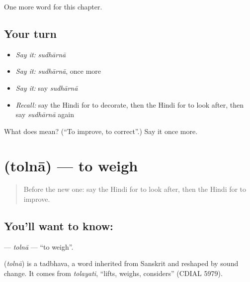 \begin{grammarlens}[title={What you've built}]
One more word for this chapter.
\end{grammarlens}

\subsection*{Your turn}
\begin{itemize}
\raggedright
  \item \emph{Say it:} \emph{sudhārnā}
  \item \emph{Say it:} \emph{sudhārnā}, once more
  \item \emph{Say it:} say \emph{sudhārnā}
  \item \emph{Recall:} say the Hindi for to decorate, then the Hindi for to look after, then say \emph{sudhārnā} again
\end{itemize}

\begin{tcolorbox}[breakable,colback=teal!4,colframe=teal!35!black,title={Before you move on}]
What does  mean? (\textquotedblleft{}To improve, to correct\textquotedblright{}.) Say it once more.
\end{tcolorbox}
\section[\texorpdfstring{\hi{तोलना} (tolnā)}{तोलना (tolnā)}]{ (tolnā) — to weigh}

\label{lesson:HI-C174-tolna}



\begin{quote}
Before the new one: say the Hindi for to look after, then the Hindi for to improve.
\end{quote}

\subsection*{You'll want to know: }
\textbf{} — \emph{tolnā} — \textquotedblleft{}to weigh\textquotedblright{}.

\begin{cousinweb}
\textbf{} (\emph{tolnā}) is a tadbhava, a word inherited from Sanskrit and reshaped by sound change. It comes from \emph{tolayati}, \textquotedblleft{}lifts, weighs, considers\textquotedblright{} (CDIAL 5979).
\end{cousinweb}

